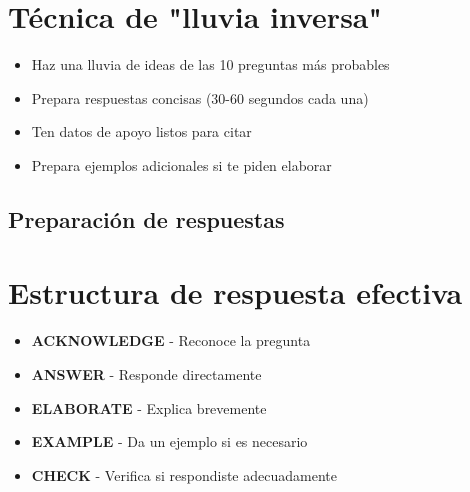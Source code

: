 \documentclass[a4paper,11pt]{article}
\begin{document}
\vspace{0.2cm}

\section{Técnica de "lluvia inversa"}

\begin{itemize}

  \item Haz una lluvia de ideas de las 10 preguntas más probables

  \item Prepara respuestas concisas (30-60 segundos cada una)

  \item Ten datos de apoyo listos para citar

  \item Prepara ejemplos adicionales si te piden elaborar

\end{itemize}

\vspace{0.2cm}

\subsection{Preparación de respuestas}

\vspace{0.2cm}

\section{Estructura de respuesta efectiva}

\begin{itemize}

  \item \textbf{ACKNOWLEDGE} - Reconoce la pregunta

  \item \textbf{ANSWER} - Responde directamente

  \item \textbf{ELABORATE} - Explica brevemente

  \item \textbf{EXAMPLE} - Da un ejemplo si es necesario

  \item \textbf{CHECK} - Verifica si respondiste adecuadamente

\end{itemize}
\end{document}
